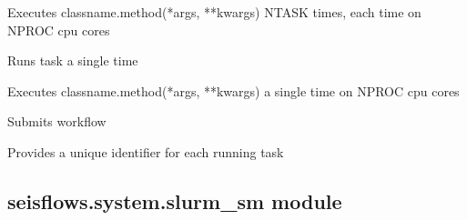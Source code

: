 \documentclass[letterpaper,10pt,english]{sphinxmanual}
\begin{document}
\begin{fulllineitems}
\begin{fulllineitems}
Executes classname.method(*args, **kwargs) NTASK times, each time on
NPROC cpu cores

\end{fulllineitems}


\begin{fulllineitems}
\label{\detokenize{ref/seisflows.system:seisflows.system.slurm_lg.slurm_lg.run_single}}
Runs task a single time

Executes classname.method(*args, **kwargs) a single time on NPROC
cpu cores

\end{fulllineitems}


\begin{fulllineitems}
\label{\detokenize{ref/seisflows.system:seisflows.system.slurm_lg.slurm_lg.submit}}
Submits workflow

\end{fulllineitems}


\begin{fulllineitems}
\label{\detokenize{ref/seisflows.system:seisflows.system.slurm_lg.slurm_lg.taskid}}
Provides a unique identifier for each running task

\end{fulllineitems}


\end{fulllineitems}



\subsection{seisflows.system.slurm\_sm module}
\label{\detokenize{ref/seisflows.system:module-seisflows.system.slurm_sm}}\label{\detokenize{ref/seisflows.system:seisflows-system-slurm-sm-module}}
\end{document}
